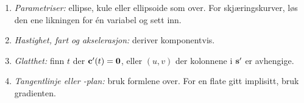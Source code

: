 \begin{oppskrift}
\begin{enumerate}
  \item \emph{Parametriser:} ellipse, kule eller ellipsoide som over. For skjæringskurver, løs den ene likningen for én variabel og sett inn.
  \item \emph{Hastighet, fart og akselerasjon:} deriver komponentvis.
  \item \emph{Glatthet:} finn $t$ der $\mathbf{c}'(t)=\mathbf{0}$, eller $(u,v)$ der kolonnene i $\mathbf{s}'$ er avhengige.
  \item \emph{Tangentlinje eller -plan:} bruk formlene over. For en flate gitt implisitt, bruk gradienten.
\end{enumerate}
\end{oppskrift}


